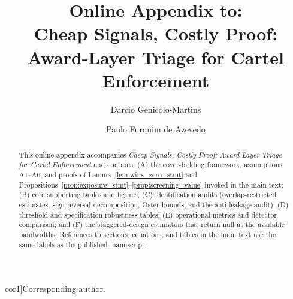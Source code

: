\documentclass[12pt,authoryear]{elsarticle}
\def\corref#1{}%
\def\cortext#1{}%
\def\ead#1{}%
\begin{document}
\sloppy
\hfuzz=300pt

\begin{frontmatter}

\title{Online Appendix to:\\
Cheap Signals, Costly Proof:\\
Award-Layer Triage for Cartel Enforcement}

\author[insper]{Darcio Genicolo-Martins\corref{cor1}}
\ead{darciogm1@insper.edu.br}
\author[insper]{Paulo Furquim de Azevedo}
\cortext[cor1]{Corresponding author.}

\begin{abstract}
\noindent This online appendix accompanies \emph{Cheap Signals,
Costly Proof: Award-Layer Triage for Cartel Enforcement} and contains: (A) the
cover-bidding framework, assumptions A1--A6, and proofs of
Lemma~\ref{lem:wins_zero_stmt} and Propositions~\ref{prop:exposure_stmt}--\ref{prop:screening_value}
invoked in the main text; (B) core supporting tables and
figures; (C) identification audits (overlap-restricted
estimates, sign-reversal decomposition, Oster bounds, and the
anti-leakage audit); (D) threshold and specification robustness
tables; (E) operational metrics and detector comparison; and
(F) the staggered-design estimators that return null at the
available bandwidths. References to sections, equations, and
tables in the main text use the same labels as the published
manuscript.
\end{abstract}

\end{frontmatter}

\appendix

\setcounter{table}{0}
\setcounter{figure}{0}
\renewcommand{\thetable}{\Alph{section}.\arabic{table}}
\renewcommand{\thefigure}{\Alph{section}.\arabic{figure}}
\makeatletter
{}
\makeatother





\end{document}

